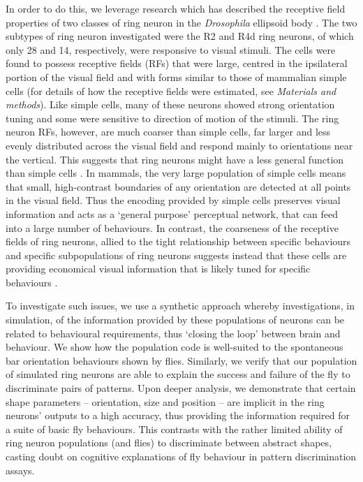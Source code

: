 In order to do this, we leverage research which has described the receptive field properties of two classes of ring neuron in the \emph{Drosophila} ellipsoid body \cite{Seelig2013}. The two subtypes of ring neuron investigated were the R2 and R4d ring neurons, of which only 28 and 14, respectively, were responsive to visual stimuli. The cells were found to possess receptive fields (RFs) that were large, centred in the ipsilateral portion of the visual field and with forms similar to those of mammalian simple cells \cite{Hubel1962} (for details of how the receptive fields were estimated, see \emph{Materials and methods}). Like simple cells, many of these neurons showed strong orientation tuning and some were sensitive to direction of motion of the stimuli. The ring neuron RFs, however, are much coarser than simple cells, far larger and less evenly distributed across the visual field and respond mainly to orientations near the vertical. This suggests that ring neurons might have a less general function than simple cells \cite{Wystrach2014}. In mammals, the very large population of simple cells means that small, high-contrast boundaries of any orientation are detected at all points in the visual field. Thus the encoding provided by simple cells preserves visual information and acts as a `general purpose' perceptual network, that can feed into a large number of behaviours. In contrast, the coarseness of the receptive fields of ring neurons, allied to the tight relationship between specific behaviours and specific subpopulations of ring neurons suggests instead that these cells are providing economical visual information that is likely tuned for specific behaviours \cite{Wystrach2014}.

To investigate such issues, we use a synthetic approach whereby investigations, in simulation, of the information provided by these populations of neurons can be related to behavioural requirements, thus `closing the loop' between brain and behaviour. We show how the population code is well-suited to the spontaneous bar orientation behaviours shown by flies. Similarly, we verify that our population of simulated ring neurons are able to explain the success and failure of the fly to discriminate pairs of patterns. Upon deeper analysis, we demonstrate that certain shape parameters -- orientation, size and position -- are implicit in the ring neurons' outputs to a high accuracy, thus providing the information required for a suite of basic fly behaviours. This contrasts with the rather limited ability of ring neuron populations (and flies) to discriminate between abstract shapes, casting doubt on cognitive explanations of fly behaviour in pattern discrimination assays.

